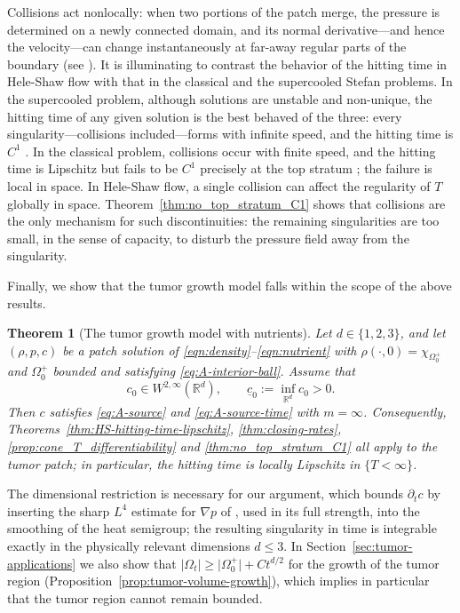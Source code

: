 \documentclass[11pt]{amsart}
\numberwithin{equation}{section}
\numberwithin{figure}{section}
\theoremstyle{plain}
\newtheorem{thm}{Theorem}[section]
\theoremstyle{definition}
\theoremstyle{remark}
\theoremstyle{plain}
\newcommand{\abs}[1]{\lvert #1 \rvert}
\def\R{\mathbb{R}}
\begin{document}
Collisions act nonlocally: when two portions of the patch merge, the
pressure is determined on a newly connected domain, and its normal derivative---and hence
the velocity---can change instantaneously at far-away regular parts of the boundary
(see \cite[App.~A.2]{PQV14}).
It is illuminating to contrast the behavior of the hitting time in Hele-Shaw flow with that in the classical and
the supercooled Stefan problems. In the supercooled problem, although solutions are unstable and non-unique, the hitting time of any given solution is the best behaved of the three: every
singularity---collisions included---forms with infinite speed, and the hitting time is
$C^1$ \cite[Thm.~1.2]{EKM25}. In the classical problem, collisions occur with finite
speed, and the hitting time is Lipschitz \cite{caffarelli1978} but fails to be $C^1$
precisely at the top stratum \cite[Thm.~1.4]{FRT26}; the failure is local in space. In
Hele-Shaw flow, a single collision can affect the regularity of $T$ globally in
space. Theorem~\ref{thm:no_top_stratum_C1} shows that
collisions are the only mechanism for such discontinuities: the remaining singularities
are too small, in the sense of capacity, to disturb the pressure field away from
the singularity.


Finally, we show that the tumor growth model falls within the scope of the
above results.

\begin{thm}[The tumor growth model with nutrients]\label{thm:tumor-application}
Let $d\in \{1,2,3\}$, and let $(\rho,p,c)$ be a patch solution of
\eqref{eqn:density}--\eqref{eqn:nutrient} with $\rho(\cdot,0)=\chi_{\Omega_0^{+}}$ and
$\Omega_0^{+}$ bounded and satisfying \eqref{eq:A-interior-ball}. Assume that
\begin{equation}\label{eq:tumor-initial-nutrient-assumptions}
    c_0\in W^{2,\infty}(\R^d),
    \qquad
    \underline c_0:=\inf_{\R^d}c_0>0 .
\end{equation}
Then $c$ satisfies \eqref{eq:A-source} and \eqref{eq:A-source-time} with
$m=\infty$. Consequently,
Theorems~\ref{thm:HS-hitting-time-lipschitz}, \ref{thm:closing-rates},
\ref{prop:cone_T_differentiability} and \ref{thm:no_top_stratum_C1} all apply to the tumor
patch; in particular, the hitting time is locally Lipschitz in $\{T<\infty\}$.
\end{thm}

The dimensional restriction is necessary for our argument, which bounds $\partial_t c$
by inserting the sharp $L^4$ estimate for $\nabla p$ of \cite{DavidPerthame}, used in its
full strength, into the smoothing of the heat semigroup; the resulting singularity in time
is integrable exactly in the physically relevant dimensions $d\leq 3$. In Section~\ref{sec:tumor-applications} we also show that $\abs{\Omega_t}\geq\abs{\Omega_0^{+}}+Ct^{d/2}$ for the growth of the tumor region
(Proposition~\ref{prop:tumor-volume-growth}), which implies
in particular that the tumor region cannot remain bounded.
\end{document}
